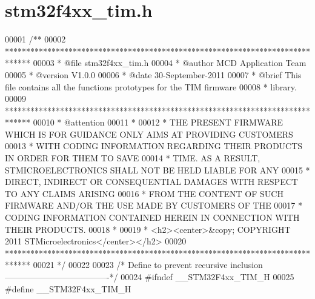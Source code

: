 \section{stm32f4xx\+\_\+tim.\+h}
\label{stm32f4xx__tim_8h_source}

\begin{DoxyCode}
00001 \textcolor{comment}{/**}
00002 \textcolor{comment}{  ******************************************************************************}
00003 \textcolor{comment}{  * @file    stm32f4xx\_tim.h}
00004 \textcolor{comment}{  * @author  MCD Application Team}
00005 \textcolor{comment}{  * @version V1.0.0}
00006 \textcolor{comment}{  * @date    30-September-2011}
00007 \textcolor{comment}{  * @brief   This file contains all the functions prototypes for the TIM firmware }
00008 \textcolor{comment}{  *          library.}
00009 \textcolor{comment}{  ******************************************************************************}
00010 \textcolor{comment}{  * @attention}
00011 \textcolor{comment}{  *}
00012 \textcolor{comment}{  * THE PRESENT FIRMWARE WHICH IS FOR GUIDANCE ONLY AIMS AT PROVIDING CUSTOMERS}
00013 \textcolor{comment}{  * WITH CODING INFORMATION REGARDING THEIR PRODUCTS IN ORDER FOR THEM TO SAVE}
00014 \textcolor{comment}{  * TIME. AS A RESULT, STMICROELECTRONICS SHALL NOT BE HELD LIABLE FOR ANY}
00015 \textcolor{comment}{  * DIRECT, INDIRECT OR CONSEQUENTIAL DAMAGES WITH RESPECT TO ANY CLAIMS ARISING}
00016 \textcolor{comment}{  * FROM THE CONTENT OF SUCH FIRMWARE AND/OR THE USE MADE BY CUSTOMERS OF THE}
00017 \textcolor{comment}{  * CODING INFORMATION CONTAINED HEREIN IN CONNECTION WITH THEIR PRODUCTS.}
00018 \textcolor{comment}{  *}
00019 \textcolor{comment}{  * <h2><center>&copy; COPYRIGHT 2011 STMicroelectronics</center></h2>}
00020 \textcolor{comment}{  ******************************************************************************}
00021 \textcolor{comment}{  */}
00022 
00023 \textcolor{comment}{/* Define to prevent recursive inclusion -------------------------------------*/}
00024 \textcolor{preprocessor}{#}\textcolor{preprocessor}{ifndef} \textcolor{preprocessor}{\_\_STM32F4xx\_TIM\_H}
00025 \textcolor{preprocessor}{#}\textcolor{preprocessor}{define} \textcolor{preprocessor}{\_\_STM32F4xx\_TIM\_H}

\end{DoxyCode}
